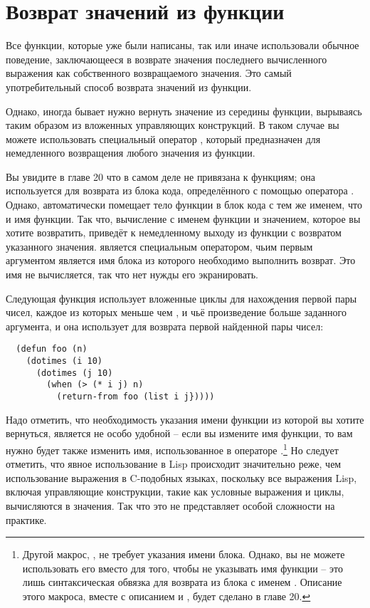 \section{Возврат значений из функции}

Все функции, которые уже были написаны, так или иначе использовали обычное поведение,
заключающееся в возврате значения последнего вычисленного выражения как собственного
возвращаемого значения.  Это самый употребительный способ возврата значений из функции.

Однако, иногда бывает нужно вернуть значение из середины функции, вырываясь таким образом
из вложенных управляющих конструкций.  В таком случае вы можете использовать специальный
оператор , который предназначен для немедленного возвращения любого
значения из функции.

Вы увидите в главе 20 что  в самом деле не привязана к функциям; она
используется для возврата из блока кода, определённого с помощью оператора .
Однако,  автоматически помещает тело функции в блок кода с тем же именем, что и
имя функции.  Так что, вычисление  с именем функции и значением, которое вы
хотите возвратить, приведёт к немедленному выходу из функции с возвратом указанного
значения.   является специальным оператором, чьим первым аргументом
является имя блока из которого необходимо выполнить возврат.  Это имя не вычисляется, так
что нет нужды его экранировать.

Следующая функция использует вложенные циклы для нахождения первой пары чисел, каждое из
которых меньше чем , и чьё произведение больше заданного аргумента, и она использует
 для возврата первой найденной пары чисел:

\begin{lstlisting}
  (defun foo (n)
    (dotimes (i 10)
      (dotimes (j 10)
        (when (> (* i j) n)
          (return-from foo (list i j}))))
\end{lstlisting}

Надо отметить, что необходимость указания имени функции из которой вы хотите вернуться,
является не особо удобной -- если вы измените имя функции, то вам нужно будет также
изменить имя, использованное в операторе .\footnote{Другой макрос,
  , не требует указания имени блока.  Однако, вы не можете использовать его
  вместо  для того, чтобы не указывать имя функции -- это лишь
  синтаксическая обвязка для возврата из блока с именем .  Описание этого
  макроса, вместе с описанием  и , будет сделано в главе
  20.}  Но следует отметить, что явное использование  в Lisp происходит
значительно реже, чем использование выражения  в C-подобных языках, поскольку
все выражения Lisp, включая управляющие конструкции, такие как условные выражения и циклы,
вычисляются в значения.  Так что это не представляет особой сложности на практике.

